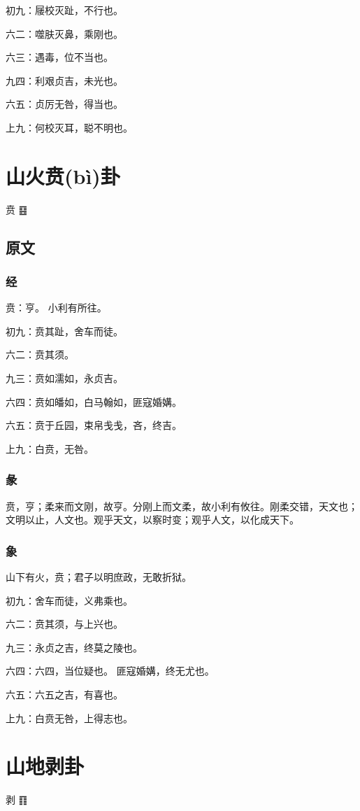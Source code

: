 \documentclass[12pt,oneside]{book}
\begin{document}
初九：屦校灭趾，不行也。

六二：噬肤灭鼻，乘刚也。

六三：遇毒，位不当也。

九四：利艰贞吉，未光也。

六五：贞厉无咎，得当也。

上九：何校灭耳，聪不明也。

\chapter{山火贲(bì)卦}
贲 {\Large ䷕}

\section{原文}
\subsection{经}
贲：亨。 小利有所往。

初九：贲其趾，舍车而徒。

六二：贲其须。

九三：贲如濡如，永贞吉。

六四：贲如皤如，白马翰如，匪寇婚媾。

六五：贲于丘园，束帛戋戋，吝，终吉。

上九：白贲，无咎。

\subsection{彖}
贲，亨；柔来而文刚，故亨。分刚上而文柔，故小利有攸往。刚柔交错，天文也；文明以止，人文也。观乎天文，以察时变；观乎人文，以化成天下。
\subsection{象}
山下有火，贲；君子以明庶政，无敢折狱。

初九：舍车而徒，义弗乘也。

六二：贲其须，与上兴也。

九三：永贞之吉，终莫之陵也。

六四：六四，当位疑也。 匪寇婚媾，终无尤也。

六五：六五之吉，有喜也。

上九：白贲无咎，上得志也。

\chapter{山地剥卦}
剥 {\Large ䷖}
\end{document}
